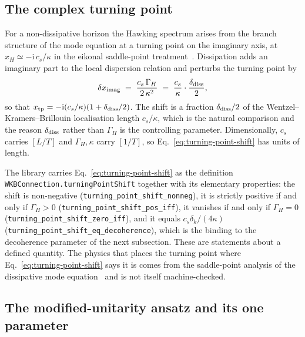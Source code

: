 \documentclass[aps,prd,reprint,nofootinbib,superscriptaddress]{revtex4-2}
\begin{document}
\subsection{The complex turning point}
\label{sec:wkb-turning}

For a non-dissipative horizon the Hawking spectrum arises from the
branch structure of the mode equation at a turning point on the
imaginary axis, at $x_H \simeq -\mathrm{i}\,c_s/\kappa$ in the
eikonal saddle-point treatment~\cite{Berry1989,Heading1962}. Dissipation
adds an imaginary part to the local dispersion relation and perturbs the
turning point by
\begin{equation}
\delta x_{\rm imag} \;=\; \frac{c_s\, \Gamma_H}{2\,\kappa^2}
  \;=\; \frac{c_s}{\kappa}\cdot\frac{\delta_{\rm diss}}{2} ,
\label{eq:turning-point-shift}
\end{equation}
so that $x_{\rm tp} = -\mathrm{i}(c_s/\kappa)(1 + \delta_{\rm diss}/2)$.
The shift is a fraction $\delta_{\rm diss}/2$ of the Wentzel--Kramers--Brillouin
localisation length $c_s/\kappa$, which is the natural comparison and
the reason $\delta_{\rm diss}$ rather than $\Gamma_H$ is the controlling
parameter. Dimensionally, $c_s$ carries $[L/T]$ and $\Gamma_H, \kappa$
carry $[1/T]$, so Eq.~\eqref{eq:turning-point-shift} has units of
length.

The library carries Eq.~\eqref{eq:turning-point-shift} as the definition
\texttt{WKBConnection.turningPointShift} together with its elementary
properties: the shift is non-negative
(\texttt{turning\_point\_shift\_nonneg}), it is strictly positive if and
only if $\Gamma_H > 0$
(\texttt{turning\_point\_shift\_pos\_iff}), it vanishes if and only if
$\Gamma_H = 0$ (\texttt{turning\_point\_shift\_zero\_iff}), and it
equals $c_s \delta_k/(4\kappa)$
(\texttt{turning\_point\_shift\_eq\_decoherence}), which is the binding
to the decoherence parameter of the next subsection. These are
statements about a defined quantity. The physics that places the turning
point where Eq.~\eqref{eq:turning-point-shift} says it is comes from the
saddle-point analysis of the dissipative mode
equation~\cite{RobertsonParentani2015,CoutantParentani2012} and is not
itself machine-checked.

\subsection{The modified-unitarity ansatz and its one parameter}
\label{sec:wkb-unitarity}
\end{document}

